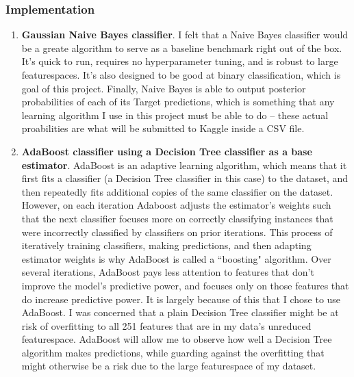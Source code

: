 \documentclass[12pt, letterpaper]{article}
\begin{document}
\subsubsection{Implementation}
\begin{enumerate}
  \item \textbf{Gaussian Naive Bayes classifier}. I felt that a Naive Bayes classifier would be a greate algorithm to serve as a baseline benchmark right out of the box. It's quick to run, requires no hyperparameter tuning, and is robust to large featurespaces. It's also designed to be good at binary classification, which is goal of this project. Finally, Naive Bayes is able to output posterior probabilities of each of its Target predictions, which is something that any learning algorithm I use in this project must be able to do -- these actual proabilities are what will be submitted to Kaggle inside a CSV file.
  \item \textbf{AdaBoost classifier using a Decision Tree classifier as a base estimator}. AdaBoost is an adaptive learning algorithm, which means that it first fits a classifier (a Decision Tree classifier in this case) to the dataset, and then repeatedly fits additional copies of the same classifier on the dataset. However, on each iteration Adaboost adjusts the estimator's weights such that the next classifier focuses more on correctly classifying instances that were incorrectly classified by classifiers on prior iterations. This process of iteratively training classifiers, making predictions, and then adapting estimator weights is why AdaBoost is called a ``boosting" algorithm. Over several iterations, AdaBoost pays less attention to features that don't improve the model's predictive power, and focuses only on those features that do increase predictive power. It is largely because of this that I chose to use AdaBoost. I was concerned that a plain Decision Tree classifier might be at risk of overfitting to all 251 features that are in my data's unreduced featurespace. AdaBoost will allow me to observe how well a Decision Tree algorithm makes predictions, while guarding against the overfitting that might otherwise be a risk due to the large featurespace of my dataset.

\end{enumerate}
\end{document}
